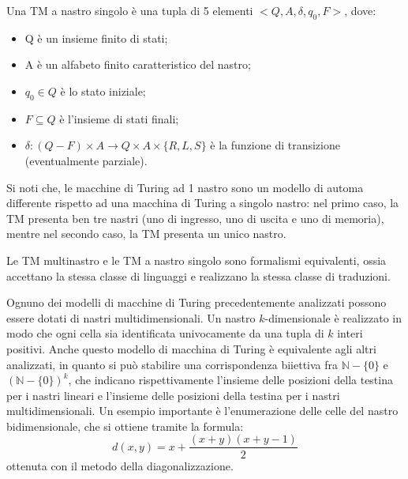   \begin{definition}
    Una TM a nastro singolo è una tupla di 5 elementi \(<Q,A,\delta, q_0, F>\), dove:
    \begin{itemize}
      \item Q è un insieme finito di stati;
      \item A è un alfabeto finito caratteristico del nastro;
      \item \(q_0 \in Q\) è lo stato iniziale;
      \item \(F\subseteq Q\) è l'insieme di stati finali;
      \item \(\delta:(Q-F)\times A \to Q\times A\times \{R,L,S\}\) è la funzione di transizione (eventualmente parziale).
    \end{itemize}
  \end{definition}

  Si noti che, le macchine di Turing ad 1 nastro sono un modello di automa differente rispetto ad una macchina di Turing a singolo nastro: nel primo caso, la TM presenta ben tre nastri (uno di ingresso, uno di uscita e uno di memoria), mentre nel secondo caso, la TM presenta un unico nastro. 

  \begin{theorem}
    Le TM multinastro e le TM a nastro singolo sono formalismi equivalenti, ossia accettano la stessa classe di linguaggi e realizzano la stessa classe di traduzioni.
  \end{theorem}


  Ognuno dei modelli di macchine di Turing precedentemente analizzati possono essere dotati di nastri multidimensionali. Un nastro \(k\)-dimensionale è realizzato in modo che ogni cella sia identificata univocamente da una tupla di \(k\) interi positivi. Anche questo modello di macchina di Turing è equivalente agli altri analizzati, in quanto si può stabilire una corrispondenza biiettiva fra \(\mathbb N - \{0\}\) e \((\mathbb N - \{0\})^k\), che indicano rispettivamente l'insieme delle posizioni della testina per i nastri lineari e l'insieme delle posizioni della testina per i nastri multidimensionali. Un esempio importante è l'enumerazione delle celle del nastro bidimensionale, che si ottiene tramite la formula:
  \begin{equation*}
    \displaystyle d(x,y) = x+\frac{(x+y)(x+y-1)}{2}
  \end{equation*}
  ottenuta con il metodo della diagonalizzazione. 